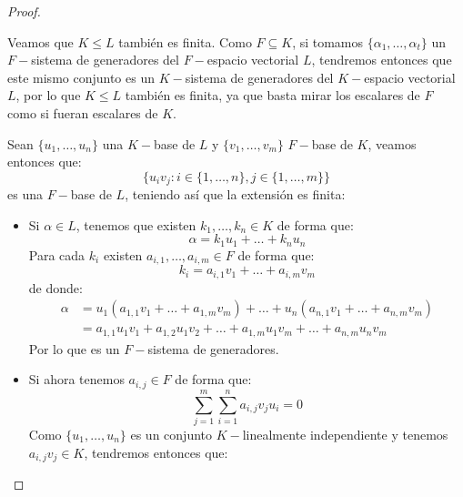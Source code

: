 \begin{lema}[de la Torre]
\begin{proof}
\begin{description}
            Veamos que $K\leq L$ también es finita. Como $F\subseteq K$, si tomamos $\{\alpha_1, \ldots, \alpha_t\}$ un $F-$sistema de generadores del $F-$espacio vectorial $L$, tendremos entonces que este mismo conjunto es un $K-$sistema de generadores del $K-$espacio vectorial $L$, por lo que $K\leq L$ también es finita, ya que basta mirar los escalares de $F$ como si fueran escalares de $K$.
            \item [$\Longleftarrow$)] Sean $\{u_1, \ldots, u_n\}$ una $K-$base de $L$ y $\{v_1, \ldots, v_m\}$ $F-$base de $K$, veamos entonces que:
                \begin{equation*}
                    \{u_i v_j : i \in \{1,\ldots,n\}, j\in \{1,\ldots,m\}\}
                \end{equation*}
                es una $F-$base de $L$, teniendo así que la extensión es finita:
                \begin{itemize}
                    \item Si $\alpha\in L$, tenemos que existen $k_1, \ldots, k_n\in K$ de forma que:
                        \begin{equation*}
                            \alpha = k_1u_1 + \ldots + k_nu_n
                        \end{equation*}
                        Para cada $k_i$ existen $a_{i,1}, \ldots, a_{i,m}\in F$ de forma que:
                        \begin{equation*}
                            k_i = a_{i,1}v_1 + \ldots + a_{i,m}v_m
                        \end{equation*}
                        de donde:
                        \begin{align*}
                            \alpha &= u_1(a_{1,1}v_1 + \ldots + a_{1,m}v_m) + \ldots + u_n(a_{n,1}v_1 + \ldots + a_{n,m}v_m) \\
                                   &= a_{1,1}u_1v_1 + a_{1,2}u_1v_2 + \ldots + a_{1,m}u_1v_m + \ldots + a_{n,m}u_nv_m
                        \end{align*}
                        Por lo que es un $F-$sistema de generadores.
                    \item Si ahora tenemos $a_{i,j}\in F$ de forma que:
                        \begin{equation*}
                            \sum\limits_{j=1}^{m}\sum\limits_{i=1}^{n} a_{i,j}v_ju_i = 0
                        \end{equation*}
                        Como $\{u_1,\ldots,u_n\}$ es un conjunto $K-$linealmente independiente y tenemos $a_{i,j}v_j\in K$, tendremos entonces que:

\end{itemize}
\end{description}
\end{proof}
\end{lema}
